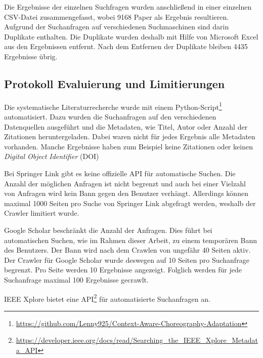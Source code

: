 \documentclass[conference,compsoc,ngerman]{IEEEtran}
\begin{document}
Die Ergebnisse der einzelnen Suchfragen wurden anschließend in einer einzelnen CSV-Datei zusammengefasst, wobei 9168 Paper als Ergebnis resultieren. Aufgrund der Suchanfragen auf verschiedenen Suchmaschinen sind darin Duplikate enthalten. Die Duplikate wurden deshalb mit Hilfe von Microsoft Excel aus den Ergebnissen entfernt.
Nach dem Entfernen der Duplikate bleiben 4435 Ergebnisse übrig.

\subsection{Protokoll Evaluierung und Limitierungen}
Die systematische Literaturrecherche wurde mit einem Python-Script\footnote{\url{https://github.com/Lenny925/Context-Aware-Choreography-Adaptation}} automatisiert. Dazu wurden die Suchanfragen auf den verschiedenen Datenquellen ausgeführt und die Metadaten, wie Titel, Autor oder Anzahl der Zitationen heruntergeladen. Dabei waren nicht für jedes Ergebnis alle Metadaten vorhanden. Manche Ergebnisse haben zum Beispiel keine Zitationen oder keinen \textit{Digital Object Identifier} (DOI)

Bei Springer Link gibt es keine offizielle API für automatische Suchen. Die Anzahl der möglichen Anfragen ist nicht begrenzt und auch bei einer Vielzahl von Anfragen wird kein Bann gegen den Benutzer verhängt. Allerdings können maximal 1000 Seiten pro Suche von Springer Link abgefragt werden, weshalb der Crawler limitiert wurde. 

Google Scholar beschränkt die Anzahl der Anfragen. Dies führt bei automatischen Suchen, wie im Rahmen dieser Arbeit, zu einem temporären Bann des Benutzers. Der Bann wird nach dem Crawlen von ungefähr 40 Seiten aktiv. Der Crawler für Google Scholar wurde deswegen auf 10 Seiten pro Suchanfrage begrenzt. Pro Seite werden 10 Ergebnisse angezeigt. Folglich werden für jede Suchanfrage maximal 100 Ergebnisse gecrawlt. 

IEEE Xplore bietet eine API\footnote{\url{https://developer.ieee.org/docs/read/Searching_the_IEEE_Xplore_Metadata_API}} für automatisierte Suchanfragen an.

%
%
%
%
\end{document}
